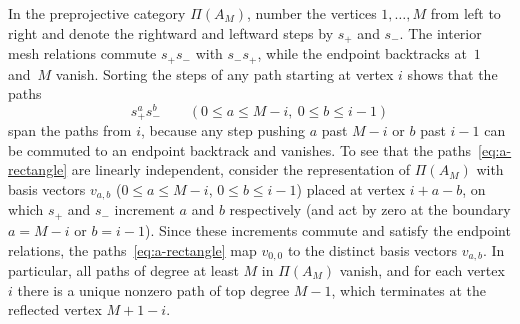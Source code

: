 In the preprojective category $\Pi(A_M)$, number the vertices $1,\ldots,M$ from left to right and denote the rightward and leftward steps by $s_+$ and $s_-$. The interior mesh relations commute $s_+s_-$ with $s_-s_+$, while the endpoint backtracks at~$1$ and~$M$ vanish. Sorting the steps of any path starting at vertex $i$ shows that the paths
\begin{equation}
  s_+^a s_-^b\qquad(0\leq a\leq M-i,\ 0\leq b\leq i-1)
  \label{eq:a-rectangle}
\end{equation}
span the paths from $i$, because any step pushing $a$ past $M-i$ or $b$ past $i-1$ can be commuted to an endpoint backtrack and vanishes. To see that the paths~\eqref{eq:a-rectangle} are linearly independent, consider the representation of $\Pi(A_M)$ with basis vectors $v_{a,b}$ ($0\leq a\leq M-i$, $0\leq b\leq i-1$) placed at vertex $i+a-b$, on which $s_+$ and $s_-$ increment $a$ and $b$ respectively (and act by zero at the boundary $a=M-i$ or $b=i-1$). Since these increments commute and satisfy the endpoint relations, the paths~\eqref{eq:a-rectangle} map $v_{0,0}$ to the distinct basis vectors $v_{a,b}$. In particular, all paths of degree at least $M$ in $\Pi(A_M)$ vanish, and for each vertex $i$ there is a unique nonzero path of top degree $M-1$, which terminates at the reflected vertex $M+1-i$.

